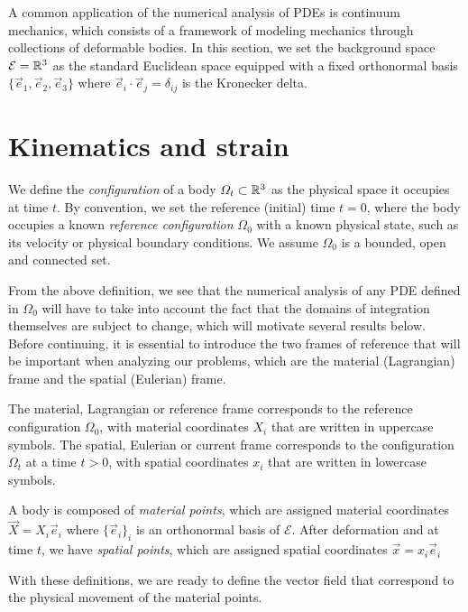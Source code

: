 A common application of the numerical analysis of PDEs is continuum mechanics, which consists of a framework of modeling mechanics through collections of deformable bodies. In this section, we set the background space $\mathcal{E} = \mathbb{R}^3$ as the standard Euclidean space equipped with a fixed orthonormal basis $\{\vec e_1, \vec e_2, \vec e_3\}$ where $\vec e_i\cdot\vec e_j = \delta_{ij}$ is the Kronecker delta.
\section{Kinematics and strain}
\begin{definition}[Configuration]
    We define the \textit{configuration} of a body $\Omega_t\subset \mathbb{R}^3$ as the physical space it occupies at time $t$. By convention, we set the reference (initial) time $t=0$, where the body occupies a known \textit{reference configuration} $\Omega_0$ with a known physical state, such as its velocity or physical boundary conditions. We assume $\Omega_0$ is a bounded, open and connected set.
\end{definition}
From the above definition, we see that the numerical analysis of any PDE defined in $\Omega_0$ will have to take into account the fact that the domains of integration themselves are subject to change, which will motivate several results below. Before continuing, it is essential to introduce the two frames of reference that will be important when analyzing our problems, which are the material (Lagrangian) frame and the spatial (Eulerian) frame. 
\begin{definition}
    The material, Lagrangian or reference frame corresponds to the reference configuration $\Omega_0$, with material coordinates $X_i$ that are written in uppercase symbols. The spatial, Eulerian or current frame corresponds to the configuration $\Omega_t$ at a time $t>0$, with spatial coordinates $x_i$ that are written in lowercase symbols. 

    A body is composed of \textit{material points}, which are assigned material coordinates $\vec X=X_i\vec e_i$ where $\{\vec e_i\}_i$ is an orthonormal basis of $\mathcal{E}$. After deformation and at time $t$, we have \textit{spatial points}, which are assigned spatial coordinates $\vec x = x_i\vec e_i$
\end{definition}
With these definitions, we are ready to define the vector field that correspond to the physical movement of the material points. 
